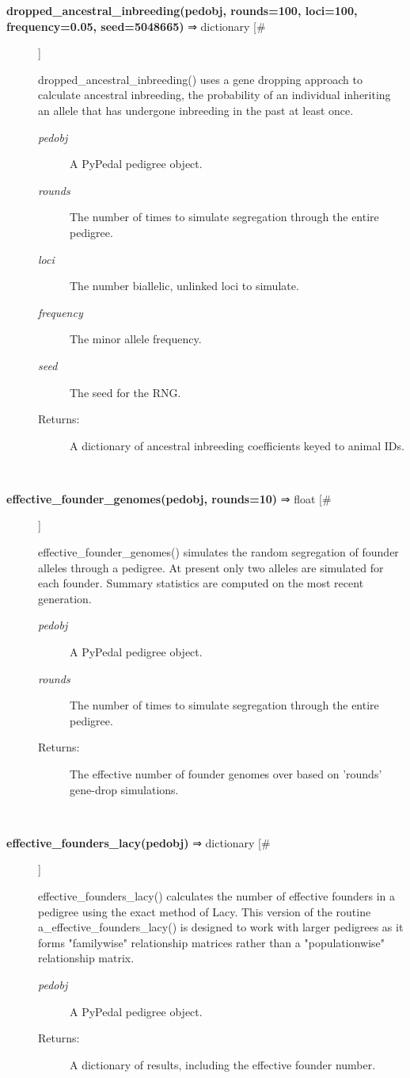\documentclass{article}
\begin{document}
\begin{description}
\item[\textbf{dropped\_ancestral\_inbreeding(pedobj, rounds=100, loci=100, frequency=0.05, seed=5048665)} ⇒ dictionary [\#]
]
\par dropped\_ancestral\_inbreeding() uses a gene dropping approach to calculate
ancestral inbreeding, the probability of an individual inheriting an allele
that has undergone inbreeding in the past at least once.
\begin{description}
\item[\textit{pedobj}
]
A PyPedal pedigree object.
\item[\textit{rounds}
]
The number of times to simulate segregation through the entire pedigree.
\item[\textit{loci}
]
The number biallelic, unlinked loci to simulate.
\item[\textit{frequency}
]
The minor allele frequency.
\item[\textit{seed}
]
The seed for the RNG.
\item[Returns:
]
A dictionary of ancestral inbreeding coefficients keyed to animal IDs.
\end{description}\\

\item[\textbf{effective\_founder\_genomes(pedobj, rounds=10)} ⇒ float [\#]
]
\par effective\_founder\_genomes() simulates the random segregation of founder alleles through a pedigree.
At present only two alleles are simulated for each founder.  Summary statistics are
computed on the most recent generation.
\begin{description}
\item[\textit{pedobj}
]
A PyPedal pedigree object.
\item[\textit{rounds}
]
The number of times to simulate segregation through the entire pedigree.
\item[Returns:
]
The effective number of founder genomes over based on 'rounds' gene-drop simulations.
\end{description}\\

\item[\textbf{effective\_founders\_lacy(pedobj)} ⇒ dictionary [\#]
]
\par effective\_founders\_lacy() calculates the number of effective founders in a pedigree
using the exact method of Lacy.  This version of the routine a\_effective\_founders\_lacy()
is designed to work with larger pedigrees as it forms "familywise" relationship matrices
rather than a "populationwise" relationship matrix.
\begin{description}
\item[\textit{pedobj}
]
A PyPedal pedigree object.
\item[Returns:
]
A dictionary of results, including the effective founder number.
\end{description}\\


\end{description}
\end{document}
